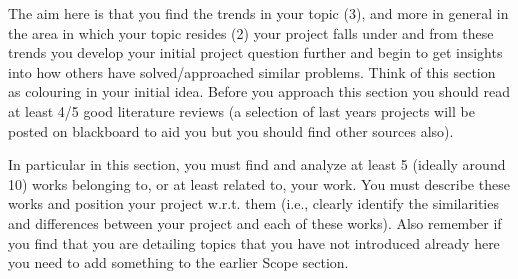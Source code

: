 The aim here is that you find the trends in your topic (3), and more in general in the area in which your topic resides (2) your project falls under and from these trends you develop your initial project question further and begin to get insights into how others have solved/approached similar problems. Think of this section as colouring in your initial idea. Before you approach this section you should read at least 4/5 good literature reviews (a selection of last years projects will be posted on blackboard to aid you but you should find other sources also).

In particular in this section, you must find and analyze at least 5 (ideally around 10) works belonging to, or at least related to, your work. You must describe these works and position your project w.r.t. them (i.e., clearly identify the similarities and differences between your project and each of these works). Also remember if you find that you are detailing topics that you have not introduced already here you need to add something to the earlier Scope section.